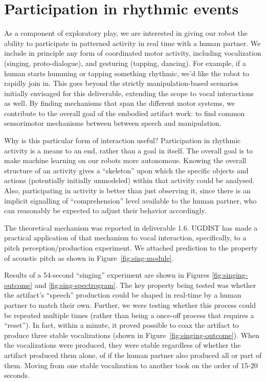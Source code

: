 \section{Participation in rhythmic events}

\label{sect:rhythm}

As a component of exploratory play, we are interested in giving our
robot the ability to participate in patterned activity in real time
with a human partner.  We include in principle any form of
coordinated motor activity, including vocalization
(singing, proto-dialogue), and gesturing (tapping, dancing).
%
For example, if a human starts humming or tapping something rhythmic, 
we'd like the robot to rapidly join in.
%
This goes beyond the strictly manipulation-based scenarios initially
envisaged for this deliverable, extending the scope to vocal interactions
as well.  By finding mechanisms that span the different motor systems,
we contribute to the overall goal of the embodied artifact work: to
find common sensorimotor mechanisms between between speech and 
manipulation.


Why is this particular form of interaction
useful?  Participation in rhythmic activity is a means to
an end, rather than a goal in itself.  The overall goal is to make
machine learning on our robots more autonomous.
%
Knowing the overall structure of an activity gives a ``skeleton'' upon
which the specific objects and actions (potentially initially
unmodeled) within that activity could be analysed.
%
Also, participating in activity is better than just observing it,
since there is an implicit signalling of ``comprehension'' level
available to the human partner, who can reasonably be expected to
adjust their behavior accordingly.


The theoretical mechanism was reported in deliverable 1.6.  
UGDIST has made a practical application of that mechanism to
vocal interaction, specifically, to a pitch perception/production
experiment.  We attached prediction to the property of acoustic pitch
as shown in Figure~\ref{fig:sing-module}.


Results of a 54-second ``singing'' experiment are shown in 
Figures \ref{fig:singing-outcome} and \ref{fig:sing-spectrogram}. 
%
The key property being tested was whether the artifact's 
``speech'' production could be shaped in real-time by
a human partner to match their own.
%
Further, we were testing whether this process could be
repeated multiple times (rather than being a once-off
process that requires a ``reset'').
%
In fact, within a minute, it proved possible to
coax the artifact to produce three stable vocalizations
(shown in Figure~\ref{fig:singing-outcome}).
%
When the vocalizations were produced, they were stable
regardless of whether the artifact produced them alone,
of if the human partner also produced all or part of them.
%
Moving from one stable vocalization to another 
took on the order of 15-20 seconds.

